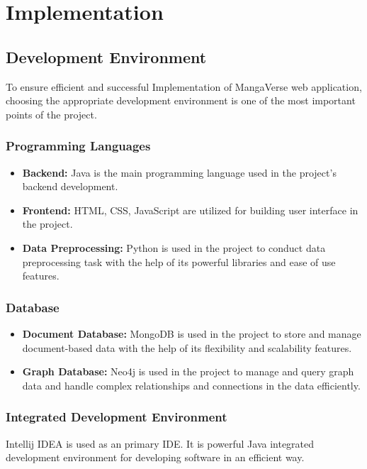 \chapter{Implementation}

\section{Development Environment}
To ensure efficient and successful Implementation of MangaVerse web application,
choosing the appropriate development environment is one of the most important points of the project.

\subsection*{Programming Languages}
\begin{itemize}
    \item \textbf{Backend:} Java is the main programming language used in the project’s backend development.
    \item \textbf{Frontend:} HTML, CSS, JavaScript are utilized for building user interface in the project.
    \item \textbf{Data Preprocessing:} Python is used in the project to conduct data preprocessing task with the help of its powerful libraries and ease of use features.
\end{itemize}

\subsection*{Database}
\begin{itemize}
    \item \textbf{Document Database:} MongoDB is used in the project to store and manage document-based data with the help of its flexibility and scalability features.
    \item \textbf{Graph Database:} Neo4j is used in the project to manage and query graph data and handle complex relationships and connections in the data efficiently.
\end{itemize}

\subsection*{Integrated Development Environment} Intellij IDEA is used as an primary IDE. It is powerful Java 
integrated development environment for developing software in an efficient way.


